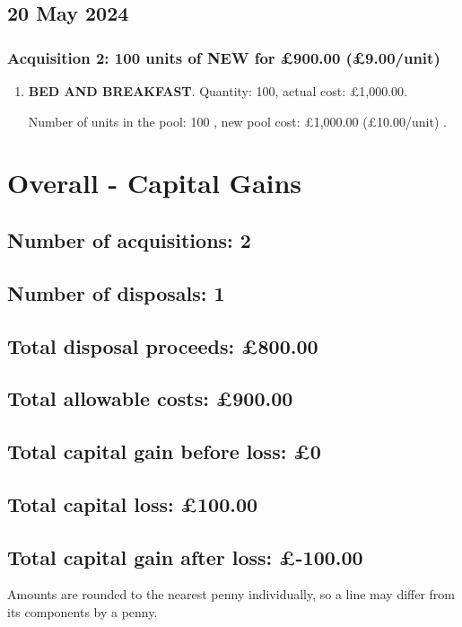\documentclass{article}
\begin{document}
\subsection*{20 May 2024}
\subsubsection*{
    Acquisition 2: 100 units of NEW for £900.00
    (£9.00/unit)%
}

\begin{enumerate}
\item \textbf{BED AND BREAKFAST}. Quantity: 100,
    actual cost: £1,000.00.

    Number of units in the pool:
    100%
,
    new pool cost: £1,000.00
    (£10.00/unit)%
.

\end{enumerate}




\clearpage
\section*{Overall - Capital Gains}
\subsection*{Number of acquisitions: 2}
\subsection*{Number of disposals: 1}
\subsection*{Total disposal proceeds: £800.00}
\subsection*{Total allowable costs: £900.00}
\subsection*{Total capital gain before loss: £0}
\subsection*{Total capital loss: £100.00}
\subsection*{Total capital gain after loss: £-100.00}
\vspace{1em}
Amounts are rounded to the nearest penny individually, so a line may differ from its components by a penny.
\vspace{2em}
\end{document}
